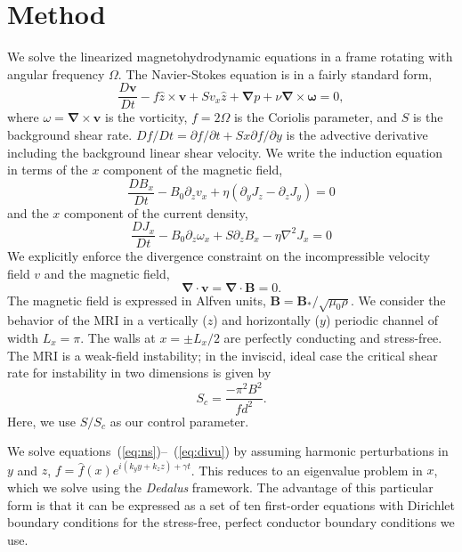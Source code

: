 \documentclass[aps,prl,reprint,superscriptaddress]{revtex4-1}
\newcommand{\SSC}{S/S_{c}}
\begin{document}
\section{Method}
\label{sec:method}
We solve the linearized magnetohydrodynamic equations in a frame rotating with angular frequency $\Omega$. The Navier-Stokes equation is in a fairly standard form,
\begin{equation}
  \label{eq:ns}
  \frac{D \mathbf{v}}{Dt} - f \hat{z} \times \mathbf{v} + S v_x \hat{z} + \mathbf{\nabla}{p} + \nu \mathbf{\nabla} \times \mathbf{\omega} = 0,
\end{equation}
where $\omega = \mathbf{\nabla} \times \mathbf{v}$ is the vorticity, $f = 2 \Omega$ is the Coriolis parameter, and $S$ is the background shear rate. $Df/Dt = \partial f/\partial t + S x \partial f/\partial y$ is the advective derivative including the background linear shear velocity.  We write the induction equation in terms of the $x$ component of the magnetic field,
\begin{equation}
  \label{eq:Bx}
  \frac{D B_x}{Dt} - B_0 \partial_z v_x + \eta (\partial_y J_z - \partial_z J_y) = 0
\end{equation}
and the $x$ component of the current density,
\begin{equation}
  \label{eq:Jx}
  \frac{D J_x}{Dt} - B_0 \partial_z \omega_x + S \partial_z B_x - \eta \nabla^2 J_x = 0
\end{equation}
We explicitly enforce the divergence constraint on the incompressible velocity field $v$ and the magnetic field,
\begin{equation}
  \label{eq:divu}
  \mathbf{\nabla} \cdot \mathbf{v} = \mathbf{\nabla} \cdot \mathbf{B} = 0.
\end{equation}
The magnetic field is expressed in Alfven units, $\mathbf{B} = \mathbf{B_*}/\sqrt{\mu_0 \rho}$.
We consider the behavior of the MRI in a vertically ($z$) and horizontally ($y$) periodic channel of width $L_x = \pi$. The walls at $x = \pm L_x/2$ are perfectly conducting and stress-free. The MRI is a weak-field instability; in the inviscid, ideal case the critical shear rate for instability in two dimensions is given by
\begin{equation}
  \label{eq:Sc}
  S_c = \frac{-\pi^2 B^2}{f d^2}.
\end{equation}
Here, we use $\SSC$ as our control parameter. 

We solve equations~(\ref{eq:ns})--~(\ref{eq:divu}) by assuming harmonic perturbations in $y$ and $z$, $f = \hat{f}(x) e^{i(k_y y + k_z z) + \gamma t}$. This reduces to an eigenvalue problem in $x$, which we solve using the \emph{Dedalus} framework. The advantage of this particular form is that it can be expressed as a set of ten first-order equations with Dirichlet boundary conditions for the stress-free, perfect conductor boundary conditions we use. 
\end{document}
